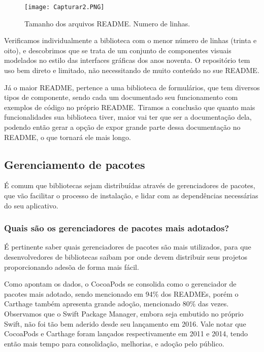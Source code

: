 \documentclass[preprint,12pt,authoryear]{elsarticle}
\begin{document}
\begin{figure}[!htb]
\centering
\texttt{[image: Capturar2.PNG]}
\caption{Tamanho dos arquivos README. Numero de linhas.}
\end{figure}

Verificamos individualmente a biblioteca com o menor número de linhas (trinta e oito), e descobrimos que se trata de um conjunto de componentes visuais modelados no estilo das interfaces gráficas dos anos noventa. O repositório tem uso bem direto e limitado, não necessitando de muito conteúdo no sue README.

Já o maior README, pertence a uma biblioteca de formulários, que tem diversos tipos de componente, sendo cada um documentado seu funcionamento com exemplos de código no próprio README. Tiramos a conclusão que quanto mais funcionalidades sua biblioteca tiver, maior vai ter que ser a documentação dela, podendo então gerar a opção de expor grande parte dessa documentação no README, o que tornará ele mais longo.



\subsection{Gerenciamento de pacotes}
É comum que bibliotecas sejam distribuídas através de gerenciadores de pacotes, que vão facilitar o processo de instalação, e lidar com as dependências necessárias do seu aplicativo.

\subsubsection{Quais são os gerenciadores de pacotes mais adotados?}
É pertinente saber quais gerenciadores de pacotes são mais utilizados, para que desenvolvedores de bibliotecas saibam por onde devem distribuir seus projetos proporcionando adesõa de forma mais fácil.

Como apontam os dados, o CocoaPods se consolida como o gerenciador de pacotes mais adotado, sendo mencionado em 94\% dos READMEs, porém o Carthage também apresenta grande adoção, mencionado 80\% das vezes. Observamos que o Swift Package Manager, embora seja embutido no próprio Swift, não foi tão bem aderido desde seu lançamento em 2016. Vale notar que CocoaPods e Carthage foram lançados respectivamente em 2011 e 2014, tendo então mais tempo para consolidação, melhorias, e adoção pelo público.
\end{document}
